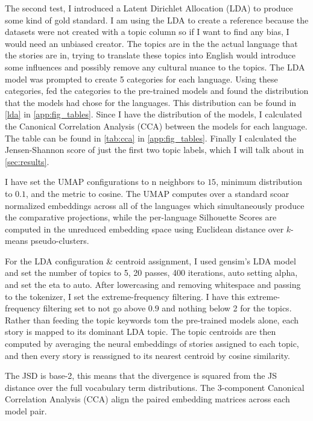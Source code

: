 \documentclass[11pt]{article} %
\begin{document}
    The second test, I introduced a Latent Dirichlet Allocation (LDA) \citep{blei2003latent}
    to produce some kind of gold standard. I am using the LDA to create a reference
    because the datasets were not created with a topic column so if I want to find
    any bias, I would need an unbiased creator. The topics are in the the actual language
    that the stories are in, trying to translate these topics into English would
    introduce some influences and possibly remove any cultural nuance to the
    topics. The LDA model was prompted to create 5 categories for each language.
    Using these categories, fed the categories to the pre-trained models and found
    the distribution that the models had chose for the languages. This
    distribution can be found in \autoref{lda} in \autoref{app:fig_tables}. Since
    I have the distribution of the models, I calculated the Canonical
    Correlation Analysis (CCA) between the models for each language. The table can
    be found in \autoref{tab:cca} in \autoref{app:fig_tables}. Finally I
    calculated the Jensen-Shannon score of just the first two topic labels, which
    I will talk about in \autoref{sec:results}.

    I have set the UMAP configurations to n neighbors to $15$, minimum
    distribution to $0.1$, and the metric to cosine. The UMAP computes over a
    standard scoar normalized embeddings across all of the languages which
    simultaneously produce the comparative projections, while the per-language Silhouette
    Scores are computed in the unreduced embedding space using Euclidean distance
    over $k$-means pseudo-clusters.

    For the LDA configuration \& centroid assignment, I used gensim's LDA model
    and set the number of topics to 5, 20 passes, 400 iterations, auto setting alpha,
    and set the eta to auto. After lowercasing and removing whitespace and passing
    to the tokenizer, I set the extreme-frequency filtering. I have this extreme-frequency
    filtering set to not go above $0.9$ and nothing below 2 for the topics.
    Rather than feeding the topic keywords tom the pre-trained models alone, each
    story is mapped to its dominant LDA topic. The topic centroids are then
    computed by averaging the neural embeddings of stories assigned to each
    topic, and then every story is reassigned to its nearest centroid by cosine similarity.

    The JSD is base-2, this means that the divergence is squared from the JS
    distance over the full vocabulary term distributions. The 3-component Canonical
    Correlation Analysis (CCA) align the paired embedding matrices across each model
    pair.
\end{document}
